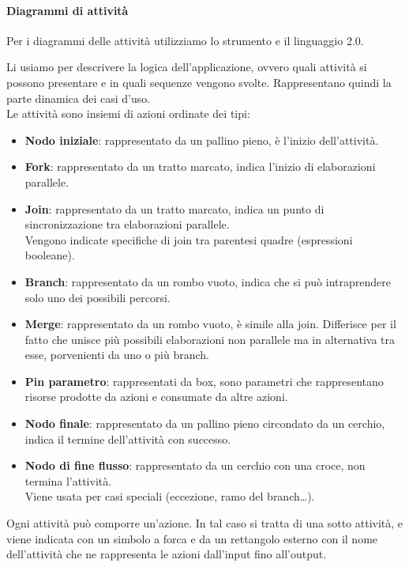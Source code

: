 		\paragraph{Diagrammi di attività}\label{PP:Sviluppo:DiagrammiAttività} %
        Per i diagrammi delle attività utilizziamo lo strumento  e il linguaggio  2.0.\par
		Li usiamo per descrivere la logica dell'applicazione, ovvero quali attività si possono presentare e in quali sequenze vengono svolte. Rappresentano quindi la parte dinamica dei casi d'uso.\\
        Le attività sono insiemi di azioni ordinate dei tipi:
        \begin{itemize}
            \item \textbf{Nodo iniziale}: rappresentato da un pallino pieno, è l'inizio dell'attività.
            \item \textbf{Fork}: rappresentato da un tratto marcato, indica l'inizio di elaborazioni parallele.
            \item \textbf{Join}: rappresentato da un tratto marcato, indica un punto di sincronizzazione tra elaborazioni parallele.\\
                Vengono indicate specifiche di join tra parentesi quadre (espressioni booleane).
            \item \textbf{Branch}: rappresentato da un rombo vuoto, indica che si può intraprendere solo uno dei possibili percorsi.
            \item \textbf{Merge}: rappresentato da un rombo vuoto, è simile alla join. Differisce per il fatto che unisce più possibili elaborazioni non parallele ma in alternativa tra esse, porvenienti da uno o più branch.
            \item \textbf{Pin parametro}: rappresentati da box, sono parametri che rappresentano risorse prodotte da azioni e consumate da altre azioni.
            \item \textbf{Nodo finale}: rappresentato da un pallino pieno circondato da un cerchio, indica il termine dell'attività con successo.
            \item \textbf{Nodo di fine flusso}: rappresentato da un cerchio con una croce, non termina l'attività.\\
                Viene usata per casi speciali (eccezione, ramo del branch\dots).
        \end{itemize}
        Ogni attività può comporre un'azione. In tal caso si tratta di una sotto attività, e viene indicata con un simbolo a forca e da un rettangolo esterno con il nome dell'attività che ne rappresenta le azioni dall'input fino all'output.\\
